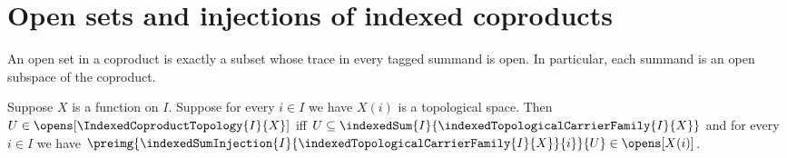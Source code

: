 \section{Open sets and injections of indexed coproducts}





An open set in a coproduct is exactly a subset whose trace in every tagged
summand is open.  In particular, each summand is an open subspace of the
coproduct.

\begin{theorem}\label{indexed_coproduct_open_iff}
    Suppose $X$ is a function on $I$.
    Suppose for every $i\in I$ we have $X(i)$ is a topological space.
    Then $U\in\opens[\IndexedCoproductTopology{I}{X}]$ iff
        $U\subseteq\indexedSum{I}{
            \indexedTopologicalCarrierFamily{I}{X}}$ and
        for every $i\in I$ we have
            $\preimg{
                \indexedSumInjection{I}{
                    \indexedTopologicalCarrierFamily{I}{X}}{i}}{U}
            \in\opens[X(i)]$.
\end{theorem}
